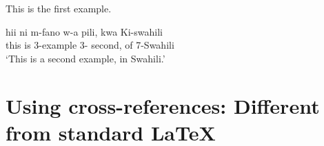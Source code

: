 \documentclass[output=paper,colorlinks,citecolor=brown]{langscibook}
\begin{document}
\ea \label{ex:diercks:XlistExample}
\begin{xlist}

\ex This is the first example. 

\ex \label{ex:diercks:SwahiliXlist}
\gll hii ni m-fano w-a pili, kwa Ki-swahili \\
this is 3-example 3-\Assoc{} second, of 7-Swahili \\
\glt `This is a second example, in Swahili.' 

\end{xlist}

\z 

\section{Using cross-references: Different from standard \LaTeX{}} \label{sec:diercks:CrossReferences}
\end{document}
